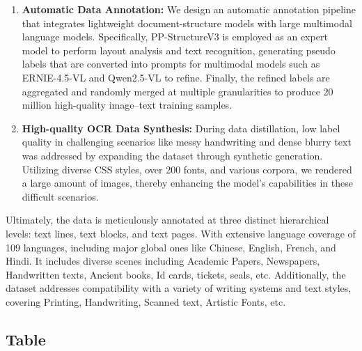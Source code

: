 \documentclass[11pt, a4paper,logo,  copyright, nonumbering]{paddleocr}
\begin{document}
\begin{enumerate}[label=\arabic*.]

\item \textbf{Automatic Data Annotation:} We design an automatic annotation pipeline that integrates lightweight document-structure models with large multimodal language models. Specifically, PP-StructureV3 is employed as an expert model to perform layout analysis and text recognition, generating pseudo labels that are converted into prompts for multimodal models such as ERNIE-4.5-VL and Qwen2.5-VL to refine. Finally, the refined labels are aggregated and randomly merged at multiple granularities to produce 20 million high-quality image–text training samples.

\item \textbf{High-quality OCR Data Synthesis:} During data distillation, low label quality in challenging scenarios like messy handwriting and dense blurry text was addressed by expanding the dataset through synthetic generation. Utilizing diverse CSS styles, over 200 fonts, and various corpora, we rendered a large amount of images, thereby enhancing the model’s capabilities in these difficult scenarios.

\end{enumerate}



Ultimately, the data is meticulously annotated at three distinct hierarchical levels: text lines, text blocks, and text pages. With extensive language coverage of 109 languages, including major global ones like Chinese, English, French, and Hindi. It includes diverse scenes including Academic Papers, Newspapers, Handwritten texts, Ancient books, Id cards, tickets, seals, etc. Additionally, the dataset addresses compatibility with a variety of writing systems and text styles, covering Printing, Handwriting, Scanned text, Artistic Fonts, etc. 


\subsection{Table}
\end{document}
